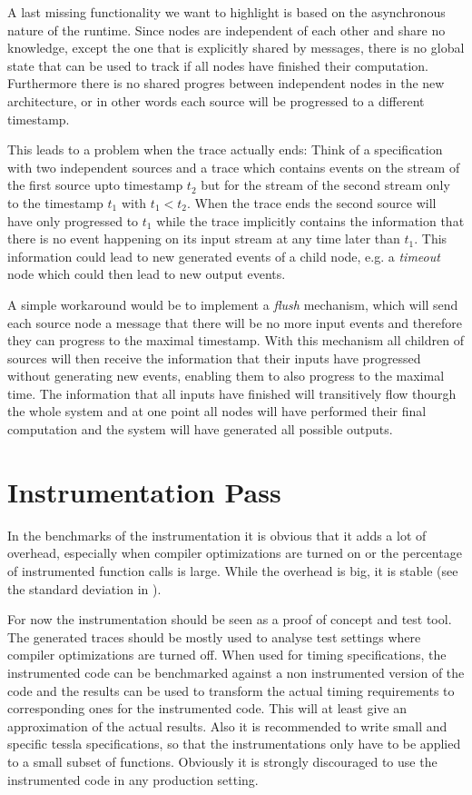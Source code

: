A last missing functionality we want to highlight is based on the asynchronous nature of the runtime.
Since nodes are independent of each other and share no knowledge, except the one that is explicitly shared by messages, there is no global state that can be used to track if all nodes have finished their computation.
Furthermore there is no shared progres between independent nodes in the new architecture, or in other words each source will be progressed to a different timestamp.

This leads to a problem when the trace actually ends: Think of a specification with two independent sources and a trace which contains events on the stream of the first source upto timestamp \(t_2\) but for the stream of the second stream only to the timestamp \(t_1\) with \(t_1 < t_2\).
When the trace ends the second source will have only progressed to \(t_1\) while the trace implicitly contains the information that there is no event happening on its input stream at any time later than \(t_1\).
This information could lead to new generated events of a child node, e.g. a \emph{timeout} node which could then lead to new output events.

A simple workaround would be to implement a \emph{flush} mechanism, which will send each source node a message that there will be no more input events and therefore they can progress to the maximal timestamp.
With this mechanism all children of sources will then receive the information that their inputs have progressed without generating new events, enabling them to also progress to the maximal time.
The information that all inputs have finished will transitively flow thourgh the whole system and at one point all nodes will have performed their final computation and the system will have generated all possible outputs.

\section{Instrumentation Pass}

In the benchmarks of the instrumentation it is obvious that it adds a lot of overhead, especially when compiler optimizations are turned on or the percentage of instrumented function calls is large.
While the overhead is big, it is stable (see the standard deviation in ).

For now the instrumentation should be seen as a proof of concept and test tool.
The generated traces should be mostly used to analyse test settings where compiler optimizations are turned off.
When used for timing specifications, the instrumented code can be benchmarked against a non instrumented version of the code and the results can be used to transform the actual timing requirements to corresponding ones for the instrumented code.
This will at least give an approximation of the actual results.
Also it is recommended to write small and specific \gls{tessla} specifications, so that the instrumentations only have to be applied to a small subset of functions.
Obviously it is strongly discouraged to use the instrumented code in any production setting.


